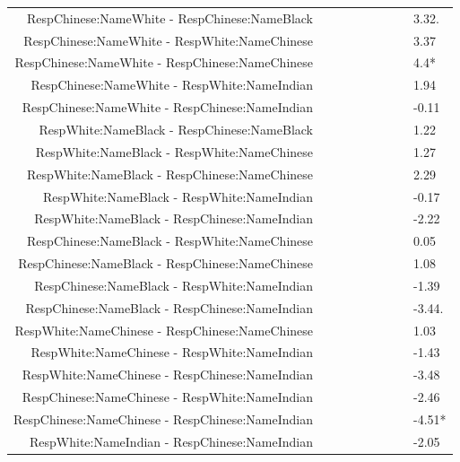 \documentclass[]{report}
\begin{document}
\begin{table}[ht]
{\begin{tabular}{rllllllll}
		RespChinese:NameWhite - RespChinese:NameBlack &  &  &  &  &  &  &  & 3.32. \\ 
		RespChinese:NameWhite - RespWhite:NameChinese &  &  &  &  &  &  &  & 3.37 \\ 
		RespChinese:NameWhite - RespChinese:NameChinese &  &  &  &  &  &  &  & 4.4* \\ 
		RespChinese:NameWhite - RespWhite:NameIndian &  &  &  &  &  &  &  & 1.94 \\ 
		RespChinese:NameWhite - RespChinese:NameIndian &  &  &  &  &  &  &  & -0.11 \\ 
		RespWhite:NameBlack - RespChinese:NameBlack &  &  &  &  &  &  &  & 1.22 \\ 
		RespWhite:NameBlack - RespWhite:NameChinese &  &  &  &  &  &  &  & 1.27 \\ 
		RespWhite:NameBlack - RespChinese:NameChinese &  &  &  &  &  &  &  & 2.29 \\ 
		RespWhite:NameBlack - RespWhite:NameIndian &  &  &  &  &  &  &  & -0.17 \\ 
		RespWhite:NameBlack - RespChinese:NameIndian &  &  &  &  &  &  &  & -2.22 \\ 
		RespChinese:NameBlack - RespWhite:NameChinese &  &  &  &  &  &  &  & 0.05 \\ 
		RespChinese:NameBlack - RespChinese:NameChinese &  &  &  &  &  &  &  & 1.08 \\ 
		RespChinese:NameBlack - RespWhite:NameIndian &  &  &  &  &  &  &  & -1.39 \\ 
		RespChinese:NameBlack - RespChinese:NameIndian &  &  &  &  &  &  &  & -3.44. \\ 
		RespWhite:NameChinese - RespChinese:NameChinese &  &  &  &  &  &  &  & 1.03 \\ 
		RespWhite:NameChinese - RespWhite:NameIndian &  &  &  &  &  &  &  & -1.43 \\ 
		RespWhite:NameChinese - RespChinese:NameIndian &  &  &  &  &  &  &  & -3.48 \\ 
		RespChinese:NameChinese - RespWhite:NameIndian &  &  &  &  &  &  &  & -2.46 \\ 
		RespChinese:NameChinese - RespChinese:NameIndian &  &  &  &  &  &  &  & -4.51* \\ 
		RespWhite:NameIndian - RespChinese:NameIndian &  &  &  &  &  &  &  & -2.05 \\ 
		\hline
	\end{tabular}}
\end{table}
\end{document}
